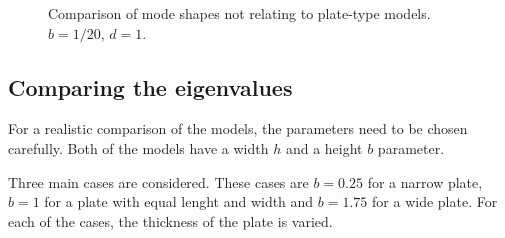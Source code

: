 \documentclass[../../main.tex]{subfiles}
\begin{document}
\begin{figure}[h!]
	\caption{Comparison of mode shapes not relating to plate-type models. $b = 1/20$, $d = 1$.}
\end{figure} \label{fig:non_plate_mode_shapes}


\subsection{Comparing the eigenvalues}
For a realistic comparison of the models, the parameters need to be chosen carefully. Both of the models have a width $h$ and a height $b$ parameter.

Three main cases are considered. These cases are $b = 0.25$ for a narrow plate, $b = 1$ for a plate with equal lenght and width and $b = 1.75$ for a wide plate. For each of the cases, the thickness of the plate is varied.
\end{document}
